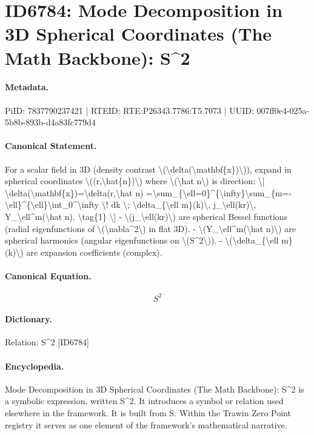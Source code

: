 \section*{ID6784: Mode Decomposition in 3D Spherical Coordinates (The Math Backbone): S\textasciicircum{}2}
\paragraph{Metadata.}
PiID: 7837790237421 | RTEID: RTE:P26343.7786:T5.7073 | UUID: 007ff0e4-025a-5b8b-893b-d4a83fc779d4

\paragraph{Canonical Statement.}
For a scalar field in 3D (density contrast \textbackslash{}(\textbackslash{}delta(\textbackslash{}mathbf\{x\})\textbackslash{})), expand in spherical coordinates \textbackslash{}((r,\textbackslash{}hat\{n\})\textbackslash{}) where \textbackslash{}(\textbackslash{}hat n\textbackslash{}) is direction: \textbackslash{}[ \textbackslash{}delta(\textbackslash{}mathbf\{x\})=\textbackslash{}delta(r,\textbackslash{}hat n) =\textbackslash{}sum\_\{\textbackslash{}ell=0\}\textasciicircum{}\{\textbackslash{}infty\}\textbackslash{}sum\_\{m=-\textbackslash{}ell\}\textasciicircum{}\{\textbackslash{}ell\}\textbackslash{}int\_0\textasciicircum{}\textbackslash{}infty \textbackslash{}! dk \textbackslash{}; \textbackslash{}delta\_\{\textbackslash{}ell m\}(k)\textbackslash{}, j\_\textbackslash{}ell(kr)\textbackslash{}, Y\_\textbackslash{}ell\textasciicircum{}m(\textbackslash{}hat n). \textbackslash{}tag\{1\} \textbackslash{}] - \textbackslash{}(j\_\textbackslash{}ell(kr)\textbackslash{}) are spherical Bessel functions (radial eigenfunctions of \textbackslash{}(\textbackslash{}nabla\textasciicircum{}2\textbackslash{}) in flat 3D). - \textbackslash{}(Y\_\textbackslash{}ell\textasciicircum{}m(\textbackslash{}hat n)\textbackslash{}) are spherical harmonics (angular eigenfunctions on \textbackslash{}(S\textasciicircum{}2\textbackslash{})). - \textbackslash{}(\textbackslash{}delta\_\{\textbackslash{}ell m\}(k)\textbackslash{}) are expansion coefficients (complex).

\paragraph{Canonical Equation.}
\[
S^2
\]

\paragraph{Dictionary.}
Relation: S\textasciicircum{}2 [ID6784]

\paragraph{Encyclopedia.}
Mode Decomposition in 3D Spherical Coordinates (The Math Backbone): S\textasciicircum{}2 is a symbolic expression, written S\textasciicircum{}2. It introduces a symbol or relation used elsewhere in the framework. It is built from S. Within the Trawin Zero Point registry it serves as one element of the framework's mathematical narrative.
